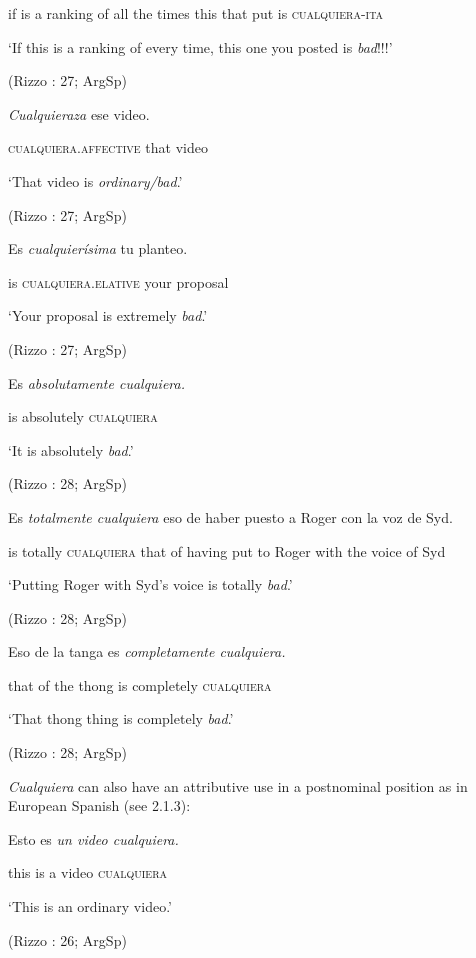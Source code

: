 \documentclass[output=paper]{langscibook}
\begin{document}
  if  is  a  ranking  of  all  the  times  this  that  put  is  \textsc{cualquiera-ita}

  ‘If this is a ranking of every time, this one you posted is \textit{bad}!!!’

  (Rizzo \citealt{Salierno2013}: 27; ArgSp)

  \textit{Cualquieraza}  ese  video.

  \textsc{cualquiera}.\textsc{affective}  that  video

  ‘That video is \textit{ordinary/bad}.’

  (Rizzo \citealt{Salierno2013}: 27; ArgSp)

  Es  \textit{cualquierísima} tu  planteo.

  is  \textsc{cualquiera}.\textsc{elative}  your  proposal

  ‘Your proposal is extremely \textit{bad}.’

  (Rizzo \citealt{Salierno2013}: 27; ArgSp)

  Es  \textit{absolutamente  cualquiera.} 

  is  absolutely  \textsc{cualquiera}  

  ‘It is absolutely \textit{bad}.’

  (Rizzo \citealt{Salierno2013}: 28; ArgSp)

  Es  \textit{totalmente  cualquiera} eso  de  haber  puesto  a  Roger  con  la voz de Syd.

  is  totally  \textsc{cualquiera} that  of  having  put  to  Roger  with  the voice of Syd

  ‘Putting Roger with Syd’s voice is totally \textit{bad}.’

  (Rizzo \citealt{Salierno2013}: 28; ArgSp)

  Eso  de  la  tanga  es  \textit{completamente  cualquiera.}

  that  of  the  thong  is  completely  \textsc{cualquiera}

  ‘That thong thing is completely \textit{bad}.’

  (Rizzo \citealt{Salierno2013}: 28; ArgSp)

\textit{Cualquiera} can also have an attributive use in a postnominal position as in European Spanish (see 2.1.3):

  Esto  es  \textit{un  video  cualquiera.}

  this  is  a  video  \textsc{cualquiera}

  ‘This is an ordinary video.’

  (Rizzo \citealt{Salierno2013}: 26; ArgSp)
\end{document}

